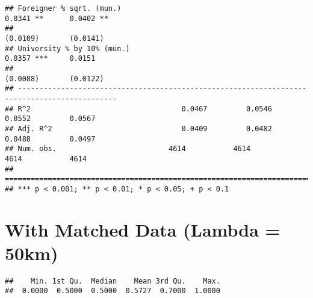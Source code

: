 \documentclass[
]{article}
\newenvironment{Shaded}{\begin{snugshade}}{\end{snugshade}}
\newcommand{\DecValTok}[1]{\textcolor[rgb]{0.00,0.00,0.81}{#1}}
\newcommand{\FloatTok}[1]{\textcolor[rgb]{0.00,0.00,0.81}{#1}}
\newcommand{\KeywordTok}[1]{\textcolor[rgb]{0.13,0.29,0.53}{\textbf{#1}}}
\newcommand{\NormalTok}[1]{#1}
\newcommand{\OperatorTok}[1]{\textcolor[rgb]{0.81,0.36,0.00}{\textbf{#1}}}
\newcommand{\StringTok}[1]{\textcolor[rgb]{0.31,0.60,0.02}{#1}}
\begin{document}
\begin{verbatim}
## Foreigner % sqrt. (mun.)                                            0.0341 **      0.0402 ** 
##                                                                    (0.0109)       (0.0141)   
## University % by 10% (mun.)                                          0.0357 ***     0.0151    
##                                                                    (0.0088)       (0.0122)   
## ---------------------------------------------------------------------------------------------
## R^2                                   0.0467         0.0546         0.0552         0.0567    
## Adj. R^2                              0.0409         0.0482         0.0488         0.0497    
## Num. obs.                          4614           4614           4614           4614         
## =============================================================================================
## *** p < 0.001; ** p < 0.01; * p < 0.05; + p < 0.1
\end{verbatim}

\hypertarget{with-matched-data-lambda-50km}{%
\section{With Matched Data (Lambda =
50km)}\label{with-matched-data-lambda-50km}}

\begin{Shaded}
\end{Shaded}

\begin{verbatim}
##    Min. 1st Qu.  Median    Mean 3rd Qu.    Max. 
##  0.0000  0.5000  0.5000  0.5727  0.7000  1.0000
\end{verbatim}

\begin{Shaded}
\end{Shaded}
\end{document}
